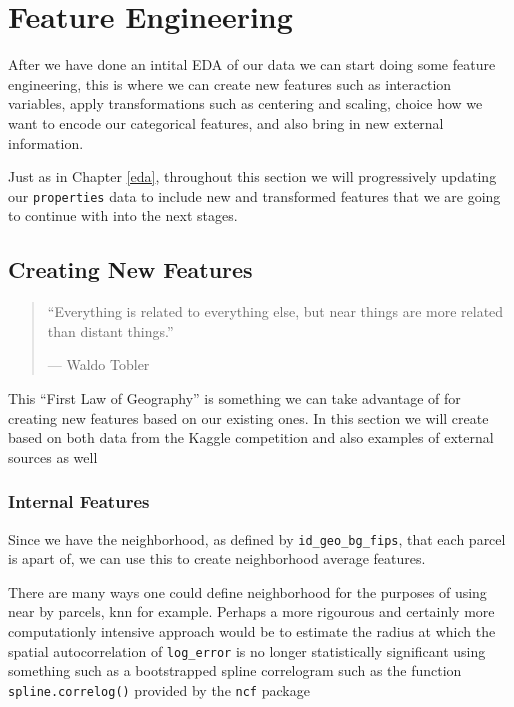 \documentclass[]{book}
\theoremstyle{definition}
\theoremstyle{definition}
\theoremstyle{definition}
\theoremstyle{remark}
\begin{document}
\chapter{Feature Engineering}\label{feat-eng}

After we have done an intital EDA of our data we can start doing some
feature engineering, this is where we can create new features such as
interaction variables, apply transformations such as centering and
scaling, choice how we want to encode our categorical features, and also
bring in new external information.

Just as in Chapter \ref{eda}, throughout this section we will
progressively updating our \texttt{properties} data to include new and
transformed features that we are going to continue with into the next
stages.

\section{Creating New Features}\label{creating-new-features}

\begin{quote}
``Everything is related to everything else, but near things are more
related than distant things.''

--- Waldo Tobler
\end{quote}

This ``First Law of Geography'' is something we can take advantage of
for creating new features based on our existing ones. In this section we
will create based on both data from the Kaggle competition and also
examples of external sources as well

\subsection{Internal Features}\label{internal-features}

Since we have the neighborhood, as defined by
\texttt{id\_geo\_bg\_fips}, that each parcel is apart of, we can use
this to create neighborhood average features.

There are many ways one could define neighborhood for the purposes of
using near by parcels, knn for example. Perhaps a more rigourous and
certainly more computationly intensive approach would be to estimate the
radius at which the spatial autocorrelation of \texttt{log\_error} is no
longer statistically significant using something such as a bootstrapped
spline correlogram such as the function \texttt{spline.correlog()}
provided by the \texttt{ncf} package
\end{document}
